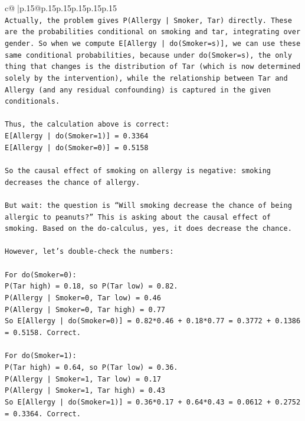 \documentclass{article}
\begin{document}
{\begin{supertabular}{c@{$\;$}|p{.15\linewidth}@{}p{.15\linewidth}p{.15\linewidth}p{.15\linewidth}p{.15\linewidth}p{.15\linewidth}}
{{{\\ 
\texttt{Actually, the problem gives P(Allergy | Smoker, Tar) directly. These are the probabilities conditional on smoking and tar, integrating over gender. So when we compute E{[}Allergy | do(Smoker=s){]}, we can use these same conditional probabilities, because under do(Smoker=s), the only thing that changes is the distribution of Tar (which is now determined solely by the intervention), while the relationship between Tar and Allergy (and any residual confounding) is captured in the given conditionals.} \\
\\ 
\texttt{Thus, the calculation above is correct:  } \\
\texttt{E{[}Allergy | do(Smoker=1){]} = 0.3364  } \\
\texttt{E{[}Allergy | do(Smoker=0){]} = 0.5158  } \\
\\ 
\texttt{So the causal effect of smoking on allergy is negative: smoking decreases the chance of allergy.} \\
\\ 
\texttt{But wait: the question is “Will smoking decrease the chance of being allergic to peanuts?” This is asking about the causal effect of smoking. Based on the do{-}calculus, yes, it does decrease the chance.} \\
\\ 
\texttt{However, let’s double{-}check the numbers:} \\
\\ 
\texttt{For do(Smoker=0):  } \\
\texttt{P(Tar high) = 0.18, so P(Tar low) = 0.82.  } \\
\texttt{P(Allergy | Smoker=0, Tar low) = 0.46  } \\
\texttt{P(Allergy | Smoker=0, Tar high) = 0.77  } \\
\texttt{So E{[}Allergy | do(Smoker=0){]} = 0.82*0.46 + 0.18*0.77 = 0.3772 + 0.1386 = 0.5158. Correct.} \\
\\ 
\texttt{For do(Smoker=1):  } \\
\texttt{P(Tar high) = 0.64, so P(Tar low) = 0.36.  } \\
\texttt{P(Allergy | Smoker=1, Tar low) = 0.17  } \\
\texttt{P(Allergy | Smoker=1, Tar high) = 0.43  } \\
\texttt{So E{[}Allergy | do(Smoker=1){]} = 0.36*0.17 + 0.64*0.43 = 0.0612 + 0.2752 = 0.3364. Correct.} \\
}}}
\end{supertabular}}
\end{document}
